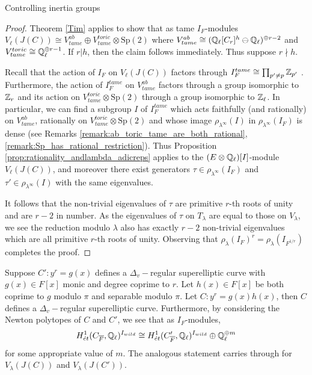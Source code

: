 \documentclass[11pt,a4paper]{article}
\newcommand{\Dv}{\Delta_v}
\begin{document}
\begin{section}{Controlling inertia groups}
\begin{proof}
Theorem \ref{Tim} applies to show that as tame $I_F$-modules $V_\ell(J(C)) \cong V^{ab}_{tame} \oplus V^{toric}_{tame} \otimes \mathrm{Sp}(2)$ where $V^{ab}_{tame} \cong (\mathbb{Q}_\ell[C_{r}]^h \ominus \mathbb{Q}_\ell )^{\oplus r-2}$ and $V^{toric}_{tame} \cong  \mathbb{Q}_\ell ^{\oplus r-1}$.
If $r|h$, then the claim follows immediately.
Thus suppose $r \nmid h$.

Recall that the action of $I_F$ on $V_\ell(J(C))$ factors through $I_F^{tame} \cong \prod_{p' \neq p} \mathbb{Z}_{p'}$ \cite[Pg. 410]{Neukirch_cohom_of_number_fields}.
Furthermore, the action of $I_F^{tame}$ on $V^{ab}_{tame}$ factors through a group isomorphic to $\mathbb{Z}_r$ and its action on $V^{toric}_{tame}\otimes \mathrm{Sp}(2)$ through a group isomorphic to $\mathbb{Z}_\ell$.
In particular, we can find a subgroup $I$ of $I_F^{tame}$ which acts faithfully (and rationally) on $V^{ab}_{tame}$, rationally on $V^{toric}_{tame}\otimes \mathrm{Sp}(2)$ and whose image $\rho_{\lambda^\infty}(I)$ in $\rho_{\lambda^\infty}(I_F)$ is dense (see Remarks \ref{remark:ab_toric_tame_are_both_rational}, \ref{remark:Sp_has_rational_restriction}).
Thus Proposition \ref{prop:rationality_andlambda_adicreps} applies to the $(E \otimes \mathbb{Q}_\ell)[I]$-module $V_\ell(J(C))$, and moreover there exist generators $\tau \in \rho_{\lambda^\infty}(I_F)$ and $\tau' \in \rho_{\lambda^\infty}(I)$ with the same eigenvalues.

It follows that the non-trivial eigenvalues of $\tau$ are primitive $r$-th roots of unity and are $r-2$ in number.
As the eigenvalues of $\tau$ on $T_\lambda$ are equal to those on  $V_\lambda$, we see the reduction modulo $\lambda$ also has exactly $r-2$ non-trivial eigenvalues which are all primitive $r$-th roots of unity.
Observing that $\rho_\lambda(I_F)^r = \rho_\lambda(I_{F^{1/r}})$ completes the proof.
\end{proof}


\begin{remark}
Suppose $C'\colon y^r = g(x)$ defines a $\Dv-$regular superelliptic curve with $g(x)\in F[x]$ monic and degree coprime to $r$. Let $h(x)\in F[x]$ be both coprime to $g$ modulo $\pi$ and separable modulo $\pi$. Let $C \colon y^r = g(x)h(x)$, then $C$ defines a $\Dv-$regular superelliptic curve.
Furthermore, by considering the Newton polytopes of $C$ and $C'$, we see that as $I_F$-modules,  \[H_{\acute{e}t}^1(C_{\overline{F}},\mathbb{Q}_\ell)^{I_{wild}} \cong H_{\acute{e}t}^1(C'_{\overline{F}},\mathbb{Q}_\ell)^{I_{wild}} \oplus \mathbb{Q}_\ell^{\oplus m}\] for some appropriate value of $m$.
The analogous  statement carries through for $V_\lambda(J(C))$ and $V_\lambda(J(C'))$.
\end{remark}


\end{section}
\end{document}
